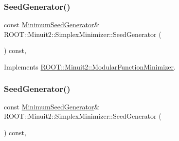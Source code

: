 \mbox{\label{classROOT_1_1Minuit2_1_1SimplexMinimizer_a7385d3ee5e4a48a796b11b51f7f0c408}} 
\subsubsection{\texorpdfstring{SeedGenerator()}{SeedGenerator()}\hspace{0.1cm}{\footnotesize\ttfamily [1/3]}}
{\footnotesize\ttfamily const \mbox{\hyperlink{classROOT_1_1Minuit2_1_1MinimumSeedGenerator}{Minimum\+Seed\+Generator}}\& R\+O\+O\+T\+::\+Minuit2\+::\+Simplex\+Minimizer\+::\+Seed\+Generator (\begin{DoxyParamCaption}{ }\end{DoxyParamCaption}) const\hspace{0.3cm}{\ttfamily [inline]}, {\ttfamily [virtual]}}



Implements \mbox{\hyperlink{classROOT_1_1Minuit2_1_1ModularFunctionMinimizer_a742930de97b0ce9ba23773874ae0894b}{R\+O\+O\+T\+::\+Minuit2\+::\+Modular\+Function\+Minimizer}}.

\mbox{\label{classROOT_1_1Minuit2_1_1SimplexMinimizer_a7385d3ee5e4a48a796b11b51f7f0c408}} 
\subsubsection{\texorpdfstring{SeedGenerator()}{SeedGenerator()}\hspace{0.1cm}{\footnotesize\ttfamily [2/3]}}
{\footnotesize\ttfamily const \mbox{\hyperlink{classROOT_1_1Minuit2_1_1MinimumSeedGenerator}{Minimum\+Seed\+Generator}}\& R\+O\+O\+T\+::\+Minuit2\+::\+Simplex\+Minimizer\+::\+Seed\+Generator (\begin{DoxyParamCaption}{ }\end{DoxyParamCaption}) const\hspace{0.3cm}{\ttfamily [inline]}, {\ttfamily [virtual]}}



